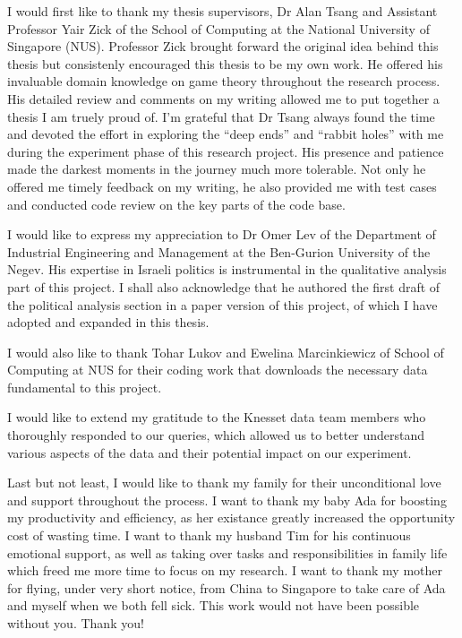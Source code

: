 \begin{acknowledgments}
  I would first like to thank my thesis supervisors, Dr Alan Tsang and
  Assistant Professor Yair Zick of the School of Computing at the National
  University of Singapore (NUS).
  Professor Zick brought forward the original idea behind this thesis but
  consistenly encouraged this thesis to be my own work.
  He offered his invaluable domain knowledge on game theory throughout the
  research process.
  His detailed review and comments on my writing allowed me to put together
  a thesis I am truely proud of.
  I'm grateful that Dr Tsang always found the time and devoted the effort in
  exploring the ``deep ends'' and ``rabbit holes'' with me during the
  experiment phase of this research project.
  His presence and patience made the darkest moments in the journey much more
  tolerable.
  Not only he offered me timely feedback on my writing, he also provided me
  with test cases and conducted code review on the key parts of the code base.

  I would like to express my appreciation to Dr Omer Lev of the Department of
  Industrial Engineering and Management at the Ben-Gurion University of the
  Negev.
  His expertise in Israeli politics is instrumental in the qualitative analysis
  part of this project.
  I shall also acknowledge that he authored the first draft of the political
  analysis section in a paper version of this project, of which I have adopted
  and expanded in this thesis.

  I would also like to thank Tohar Lukov and Ewelina Marcinkiewicz of School of
  Computing at NUS for their coding work that downloads the necessary data
  fundamental to this project.

  I would like to extend my gratitude to the Knesset data team members who
  thoroughly responded to our queries, which allowed us to better understand
  various aspects of the data and their potential impact on our experiment.

  Last but not least, I would like to thank my family for their unconditional
  love and support throughout the process.
  I want to thank my baby Ada for boosting my productivity and efficiency, as
  her existance greatly increased the opportunity cost of wasting time.
  I want to thank my husband Tim for his continuous emotional support, as well
  as taking over tasks and responsibilities in family life which freed me more
  time to focus on my research.
  I want to thank my mother for flying, under very short notice, from China to
  Singapore to take care of Ada and myself when we both fell sick.
  This work would not have been possible without you. Thank you!

\end{acknowledgments}
